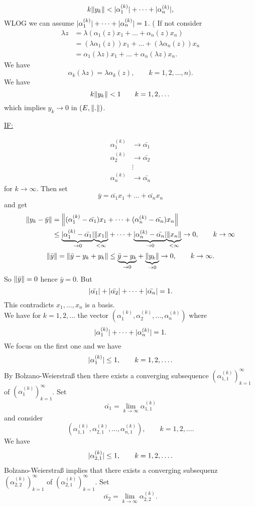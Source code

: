 \begin{beweis}
\[		k \norm{y_k} < \abs{\alpha_1^{(k)}} + \dots + \abs{\alpha_n^{(k)}},
	\]
	WLOG we can assume $\lvert\alpha_1^{(k)}\rvert+ \dots + \lvert\alpha_n^{(k)}\rvert = 1$. ( If not consider 
	\begin{align*}
		\lambda z &= \lambda ( \alpha_1(z)x_1+ \dots+ \alpha_n(z)x_n)  \\
		&= (\lambda \alpha_1(z))x_1 + \dots + (\lambda \alpha_n (z))x_n \\
		&= \alpha_1(\lambda z)x_1 + \dots + \alpha_n(\lambda z)x_n.
	\end{align*}
	We have \[
		\alpha_k(\lambda z) = \lambda \alpha_k(z), \qquad k=1,2,\dots,n).
	\]
	We have 
	\[
		k \norm{y_k} < 1 \qquad k=1,2,\dots
	\]
	which implies $y_k \to 0$ in $(E,\norm{.})$. \\
	\begin{Large}
		\underline{IF:}
	\end{Large} \begin{align*}
		\alpha_1^{(k)} &\to \bar{\alpha_1} \\
		\alpha_2^{(k)} &\to \bar{\alpha_2} \\
		&\vdots \\
		\alpha_n^{(k)} &\to \bar{\alpha_n}
	\end{align*}
	for $k \to \infty$. Then set
	\[
		\bar{y} = \bar{\alpha_1}x_1 + \dots + \bar{\alpha_n}x_n
	\]
	and get
	\begin{align*}
		\norm{y_k-\bar{y}} &= \norm{(\alpha_1^{(k)}-\bar{\alpha_1})x_1 + \dots+ (\alpha_n^{(k)}-\bar{\alpha_n})x_n} \\
		&\leq \underset{\to 0}{\underbrace{\abs{\alpha_1^{(k)}-\bar{\alpha_1}}}}\underset{< \infty}{\underbrace{\norm{x_1}}} 
		+ \dots + \underset{\to 0}{\underbrace{\abs{\alpha_n^{(k)}-\bar{\alpha_n}}}}\underset{< \infty}{\underbrace{\norm{x_n}}} \to 0, \qquad k \to \infty
	\end{align*}
	\[
		\norm{\bar{y}} = \norm{\bar{y}-y_k + y_k} \leq \underset{\to 0}{\underbrace{\bar{y}-y_k}} + \underset{\to 0}{\underbrace{\norm{y_k}}} \to 0, \qquad k \to \infty.
	\]
	So $\norm{\bar{y}} = 0$ hence $\bar{y}=0$. But
	\[
		\lvert\bar{\alpha_1}\rvert + \lvert\bar{\alpha_2}\rvert + \dots + \lvert\bar{\alpha_n}\rvert = 1.
	\]
	This contradicts $x_1, \dots,x_n$ is a basis. \\
	We have for $k= 1,2, \dots$ the vector $(\alpha_1^{(k)},\alpha_2^{(k)},\dots,\alpha_n^{(k)})$ where
	\[
		\lvert\alpha_1^{(k)}\rvert+ \dots + \lvert\alpha_n^{(k)}\rvert = 1.
	\]
	We focus on the first one and we have
	\[
		\lvert\alpha_1^{(k)}\rvert \leq 1, \qquad k =1,2,\dots.
	\]
	By Bolzano-Weierstraß then there exists a converging subsequence $(\alpha_{1,1}^{(k)})_{k=1}^{\infty}$ of $(\alpha_{1}^{(k)})_{k=1}^{\infty}$. Set
	\[
		\bar{\alpha_1} = \lim_{k \to \infty} \alpha_{1,1}^{(k)}
	\]
	and consider
	\[
		(\alpha_{1,1}^{(k)},\alpha_{2,1}^{(k)}, \dots ,\alpha_{n,1}^{(k)}), \qquad k=1,2,\dots.
	\]
	We have 
	\[
		\lvert\alpha_{2,1}^{(k)}\rvert \leq 1, \qquad k=1,2,\dots.
	\]
	Bolzano-Weierstraß implies that there exists a converging subsequenz $(\alpha_{2,2}^{(k)})_{k=1}^{\infty}$ of $(\alpha_{2,1}^{(k)})_{k=1}^{\infty}$. 
	Set 
	\[
		\bar{\alpha_2} = \lim_{k \to \infty} \alpha_{2,2}^{(k)}.
	\]
\end{beweis}